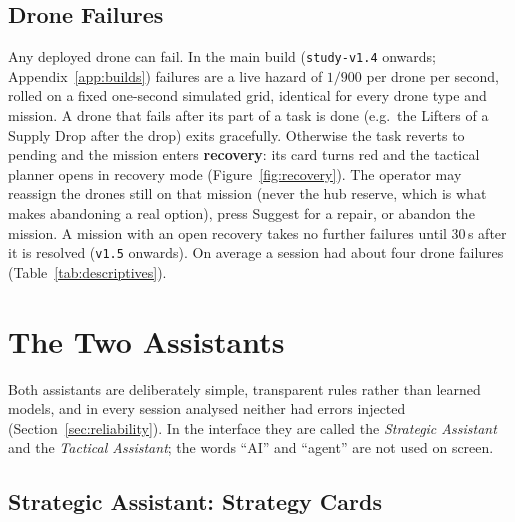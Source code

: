 \documentclass[10pt]{article}
\theoremstyle{definition}
\begin{document}
\subsection{Drone Failures}\label{sec:failures}

Any deployed drone can fail. In the main build (\texttt{study-v1.4} onwards; Appendix~\ref{app:builds}) failures are a
live hazard of $1/900$ per drone per second, rolled on a fixed one-second simulated grid, identical for every drone
type and mission. A drone that fails after its part of a task is done (e.g.\ the Lifters of a Supply Drop after the
drop) exits gracefully. Otherwise the task reverts to pending and the mission enters \textbf{recovery}: its card turns
red and the tactical planner opens in recovery mode (Figure~\ref{fig:recovery}). The operator may reassign the drones
still on that mission (never the hub reserve, which is what makes abandoning a real option), press Suggest for a
repair, or abandon the mission. A mission with an open recovery takes no further failures until 30\,s after it is
resolved (\texttt{v1.5} onwards). On average a session had about four drone failures (Table~\ref{tab:descriptives}).

\section{The Two Assistants}\label{sec:agents}

Both assistants are deliberately simple, transparent rules rather than learned models, and in every session analysed
neither had errors injected (Section~\ref{sec:reliability}). In the interface they are called the \emph{Strategic
Assistant} and the \emph{Tactical Assistant}; the words ``AI'' and ``agent'' are not used on screen.

\subsection{Strategic Assistant: Strategy Cards}\label{sec:strategic}
\end{document}
